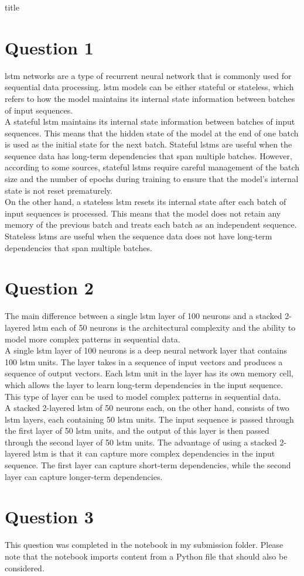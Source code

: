 \documentclass[12pt]{article}
\begin{document}
{title}

\tableofcontents


\section{Question 1}
\gls{lstm} networks are a type of recurrent neural network that is commonly used for sequential data processing. \gls{lstm} models can be either stateful or stateless, which refers to how the model maintains its internal state information between batches of input sequences. \\
A stateful \gls{lstm} maintains its internal state information between batches of input sequences. This means that the hidden state of the model at the end of one batch is used as the initial state for the next batch. Stateful \glspl{lstm} are useful when the sequence data has long-term dependencies that span multiple batches. However, according to some sources, stateful \glspl{lstm} require careful management of the batch size and the number of epochs during training to ensure that the model's internal state is not reset prematurely. \\
On the other hand, a stateless \gls{lstm} resets its internal state after each batch of input sequences is processed. This means that the model does not retain any memory of the previous batch and treats each batch as an independent sequence. Stateless \glspl{lstm} are useful when the sequence data does not have long-term dependencies that span multiple batches.

\section{Question 2}
The main difference between a single \gls{lstm} layer of 100 neurons and a stacked 2-layered \gls{lstm} each of 50 neurons is the architectural complexity and the ability to model more complex patterns in sequential data. \\
A single \gls{lstm} layer of 100 neurons is a deep neural network layer that contains 100 \gls{lstm} units. The layer takes in a sequence of input vectors and produces a sequence of output vectors. Each \gls{lstm} unit in the layer has its own memory cell, which allows the layer to learn long-term dependencies in the input sequence. This type of layer can be used to model complex patterns in sequential data. \\
A stacked 2-layered \gls{lstm} of 50 neurons each, on the other hand, consists of two \gls{lstm} layers, each containing 50 \gls{lstm} units. The input sequence is passed through the first layer of 50 \gls{lstm} units, and the output of this layer is then passed through the second layer of 50 \gls{lstm} units. The advantage of using a stacked 2-layered \gls{lstm} is that it can capture more complex dependencies in the input sequence. The first layer can capture short-term dependencies, while the second layer can capture longer-term dependencies.

\section{Question 3}
This question was completed in the notebook in my submission folder. Please note that the notebook imports content from a Python file that should also be considered.
\end{document}
